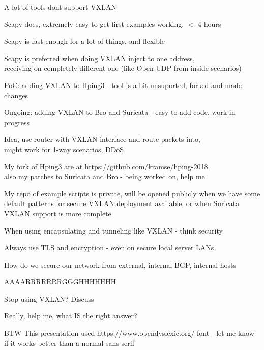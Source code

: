 \documentclass[Screen16to9,17pt,footrule]{foils}
\begin{document}

\begin{list2}
\item A lot of tools dont support VXLAN
\item Scapy does, extremely easy to get first examples working, $<$ 4 hours
\item Scapy is fast enough for a lot of things, and flexible
\item Scapy is preferred when doing VXLAN inject to one address, \\
receiving on completely different one (like Open UDP from inside scenarios)
\item PoC: adding VXLAN to Hping3 - tool is a bit unsuported, forked and made changes
\item Ongoing: adding VXLAN to Bro and Suricata - easy to add code, work in progress
\item Idea, use router with VXLAN interface and route packets into,\\ might work for 1-way scenarios, DDoS
\end{list2}

My fork of Hping3 are at \url{https://github.com/kramse/hping-2018}\\
also my patches to Suricata and Bro - being worked on, help me

My repo of example scripts is private, will be opened publicly when we have some default patterns for secure VXLAN deployment available, or when Suricata VXLAN support is more complete



\begin{list2}
\item When using encapsulating and tunneling like VXLAN - think security
\item Always use TLS and encryption - even on secure local server LANs
\item How do we secure our network from external, internal BGP, internal hosts
\item AAAARRRRRRRGGGHHHHHHH \smiley
\item Stop using VXLAN? Discuss
\end{list2}

\vskip 2cm
Really, help me, what IS the right answer? \smiley

\vskip 2cm
BTW This presentation used https://www.opendyslexic.org/ font - let me know if it works better than a normal sans serif
\end{document}
